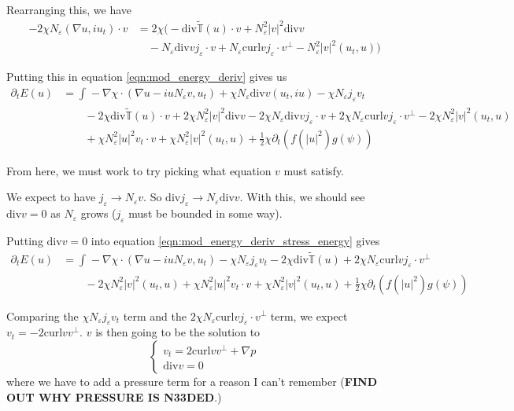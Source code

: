 \documentclass[a4paper]{article}
\renewcommand{\div}{\mathrm{div}}
\newcommand{\curl}{\mathrm{curl}}
\begin{document}
Rearranging this, we have
\begin{align}
  - 2 \chi N_\varepsilon (\nabla u, i u_t) \cdot v &= 2 \chi \big( - \div \tilde{\mathbb{T}}(u) \cdot v + N_\varepsilon^2 |v|^2 \div v \nonumber \\
  &\quad - N_\varepsilon \div v j_\varepsilon \cdot v + N_\varepsilon \curl v j_\varepsilon \cdot v^\perp - N_\varepsilon^2 |v|^2 (u_t, u) \big)
  \label{eqn:2chi_div}
\end{align}

Putting this in equation \eqref{eqn:mod_energy_deriv} gives us
\begin{align}
  \partial_t E(u) &= \int_{}^{} - \nabla \chi \cdot ( \nabla u - i u N_\varepsilon v, u_t) + \chi N_\varepsilon \div v (u_t,iu) - \chi N_\varepsilon
  j_\varepsilon v_t \nonumber \\
  &\quad \quad - 2 \chi \div \tilde{\mathbb{T}}(u) \cdot v + 2 \chi N_\varepsilon^2 |v|^2 \div v - 2 \chi N_\varepsilon \div v j_\varepsilon \cdot v +
  2 \chi N_\varepsilon \curl v j_\varepsilon \cdot v^\perp - 2 \chi N_\varepsilon^2 |v|^2 (u_t,u) \nonumber \\
  &\quad \quad + \chi N_\varepsilon^2 |u|^2 v_t \cdot v + \chi N_\varepsilon^2 |v|^2 (u_t, u) + \frac{1}{2} \chi \partial_t (f(|u|^2)g(\psi))
  \label{eqn:mod_energy_deriv_stress_energy}
\end{align}

From here, we must work to try picking what equation $v$ must satisfy.

We expect to have $j_\varepsilon \to N_\varepsilon v$. So $\div j_\varepsilon \to N_\varepsilon \div v$. With this, we should see $\div v = 0$ as
$N_\varepsilon$ grows ($j_\varepsilon$ must be bounded in some way).

Putting $\div v = 0$ into equation \eqref{eqn:mod_energy_deriv_stress_energy} gives
\begin{align*}
  \partial_t E(u) &= \int_{}^{} - \nabla \chi \cdot ( \nabla u - i u N_\varepsilon v, u_t) - \chi N_\varepsilon j_\varepsilon v_t - 2 \chi \div
  \tilde{\mathbb{T}}(u) + 2 \chi N_\varepsilon \curl v j_\varepsilon \cdot v^\perp \\
  &\quad \quad - 2 \chi N_\varepsilon^2 |v|^2 (u_t, u) + \chi N_\varepsilon^2 |u|^2 v_t \cdot v + \chi N_\varepsilon^2 |v|^2 (u_t, u) +
  \frac{1}{2} \chi \partial_t (f(|u|^2) g(\psi))
\end{align*}

Comparing the $\chi N_\varepsilon j_\varepsilon v_t$ term and the $2 \chi N_\varepsilon \curl v j_\varepsilon \cdot v^\perp$ term, we expect $v_t = - 2
\curl v v^\perp$. $v$ is then going to be the solution to
\begin{equation}
  \begin{cases}
    v_t = 2 \curl v v^\perp + \nabla p \\
    \div v = 0
  \end{cases}
  \label{eqn:v_t}
\end{equation}
where we have to add a pressure term for a reason I can't remember (\textbf{FIND OUT WHY PRESSURE IS N33DED}.)
\end{document}
